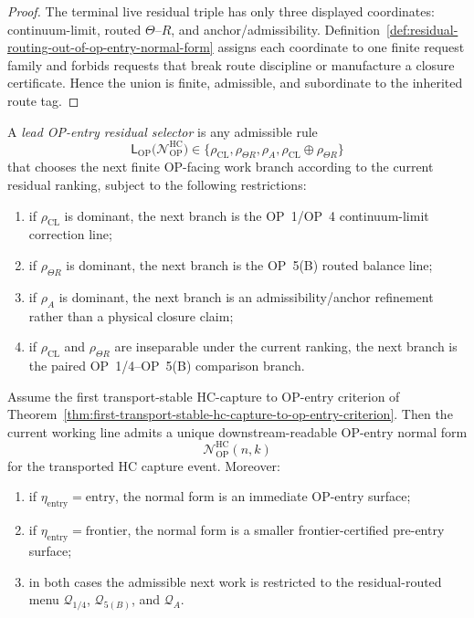 \begin{proof}
The terminal live residual triple has only three displayed coordinates: continuum-limit, routed $\Theta$--$R$, and anchor/admissibility. Definition~\ref{def:residual-routing-out-of-op-entry-normal-form} assigns each coordinate to one finite request family and forbids requests that break route discipline or manufacture a closure certificate. Hence the union is finite, admissible, and subordinate to the inherited route tag.
\end{proof}

\begin{definition}
\label{def:lead-op-entry-residual-selector}
A \emph{lead OP-entry residual selector} is any admissible rule
\[
 \mathsf L_{\mathrm{OP}}
 \bigl(\mathcal N_{\mathrm{OP}}^{\mathrm{HC}}\bigr)
 \in
 \{\rho_{\mathrm{CL}},\rho_{\Theta R},\rho_A,\rho_{\mathrm{CL}}\oplus\rho_{\Theta R}\}
\]
that chooses the next finite OP-facing work branch according to the current residual ranking, subject to the following restrictions:
\begin{enumerate}[leftmargin=2em,label=(\alph*)]
 \item if $\rho_{\mathrm{CL}}$ is dominant, the next branch is the OP~1/OP~4 continuum-limit correction line;
 \item if $\rho_{\Theta R}$ is dominant, the next branch is the OP~5(B) routed balance line;
 \item if $\rho_A$ is dominant, the next branch is an admissibility/anchor refinement rather than a physical closure claim;
 \item if $\rho_{\mathrm{CL}}$ and $\rho_{\Theta R}$ are inseparable under the current ranking, the next branch is the paired OP~1/4--OP~5(B) comparison branch.
\end{enumerate}
\end{definition}

\begin{theorem}
\label{thm:first-op-entry-normal-form-theorem}
Assume the first transport-stable HC-capture to OP-entry criterion of Theorem~\ref{thm:first-transport-stable-hc-capture-to-op-entry-criterion}. Then the current  working line admits a unique downstream-readable OP-entry normal form
\[
 \mathcal N_{\mathrm{OP}}^{\mathrm{HC}}(n,k)
\]
for the transported HC capture event. Moreover:
\begin{enumerate}[leftmargin=2em,label=(\roman*)]
 \item if $\eta_{\mathrm{entry}}=\mathrm{entry}$, the normal form is an immediate OP-entry surface;
 \item if $\eta_{\mathrm{entry}}=\mathrm{frontier}$, the normal form is a smaller frontier-certified pre-entry surface;
 \item in both cases the admissible next work is restricted to the residual-routed menu $\mathcal Q_{1/4}$, $\mathcal Q_{5(B)}$, and $\mathcal Q_A$.
\end{enumerate}
\end{theorem}

